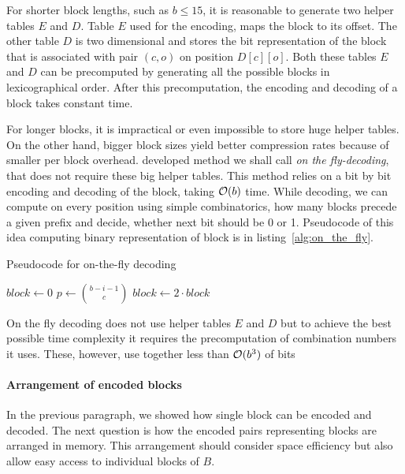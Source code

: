 For shorter block lengths, such as $b\leq 15$, it is reasonable to generate two helper tables $E$ and $D$.
Table $E$ used for the encoding, maps the block to its offset. The other table $D$ is two dimensional and
stores the bit representation of the block that is associated with pair $(c, o)$ on position $D[c][o]$.
Both these tables $E$ and $D$ can be precomputed by generating all the possible blocks in lexicographical
order. After this precomputation, the encoding and decoding of a block takes constant time.

For longer blocks, it is impractical or even impossible to store huge helper tables. On the other
hand, bigger block sizes yield better compression rates because of smaller per block overhead. \cite{navarro2012fast}
developed method we shall call \textit{on the fly-decoding}, that does not require these big helper tables. 
This method relies on a bit by bit encoding and decoding of the block, taking $\mathcal{O}(b)$ time. While decoding,
we can compute on every position using simple combinatorics, how many blocks precede a given prefix and decide,
whether next bit should be 0 or 1. Pseudocode of this idea computing binary representation of block is in
listing~\ref{alg:on_the_fly}.

\begin{algorithm}
\caption{Pseudocode for on-the-fly decoding}\label{alg:on_the_fly}
    $block \gets 0$\;
     {
        $p \gets {b-i-1\choose c}$\;
         {
            $block \gets 2\cdot block$\;
        } 
    }
\end{algorithm}

On the fly decoding does not use helper tables $E$ and $D$ but to achieve the best possible time complexity
it requires the precomputation of combination numbers it uses. These, however, use together less than $\mathcal{O}(b^3)$
of bits

\paragraph{Arrangement of encoded blocks}

In the previous paragraph, we showed how single block can be encoded and decoded. The next question is how the
encoded pairs representing blocks are arranged in memory. This arrangement should consider space efficiency
but also allow easy access to individual blocks of $B$. 

